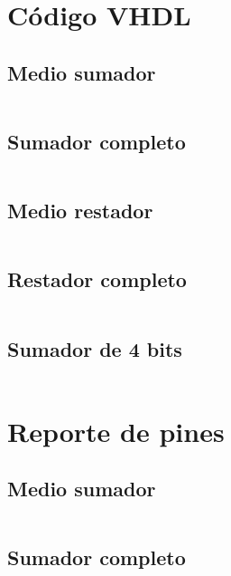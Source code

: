 \documentclass[11pt]{article}
\begin{document}
	\maketitle
	
	\section{Código VHDL}
	\subsection{Medio sumador}
	\inputminted[tabsize=4,breaklines,linenos]{vhdl}{halfAdder.vhd}
	
	\subsection{Sumador completo}
	\inputminted[tabsize=4,breaklines,linenos]{vhdl}{fullAdder.vhd}
	
	\subsection{Medio restador}
	\inputminted[tabsize=4,breaklines,linenos]{vhdl}{halfSubtractor.vhd}
	
	\subsection{Restador completo}
	\inputminted[tabsize=4,breaklines,linenos]{vhdl}{fullSubtractor.vhd}
	
	\subsection{Sumador de 4 bits}
	\inputminted[tabsize=4,breaklines,linenos]{vhdl}{fourBitsAdder.vhd}
	
	\clearpage
	
	\section{Reporte de pines}
	\subsection{Medio sumador}
	\inputminted[tabsize=4,breaklines,linenos]{vhdl}{halfAdder.rpt}
	
	\subsection{Sumador completo}
	\inputminted[tabsize=4,breaklines,linenos]{vhdl}{fullAdder.rpt}
	
\end{document}
